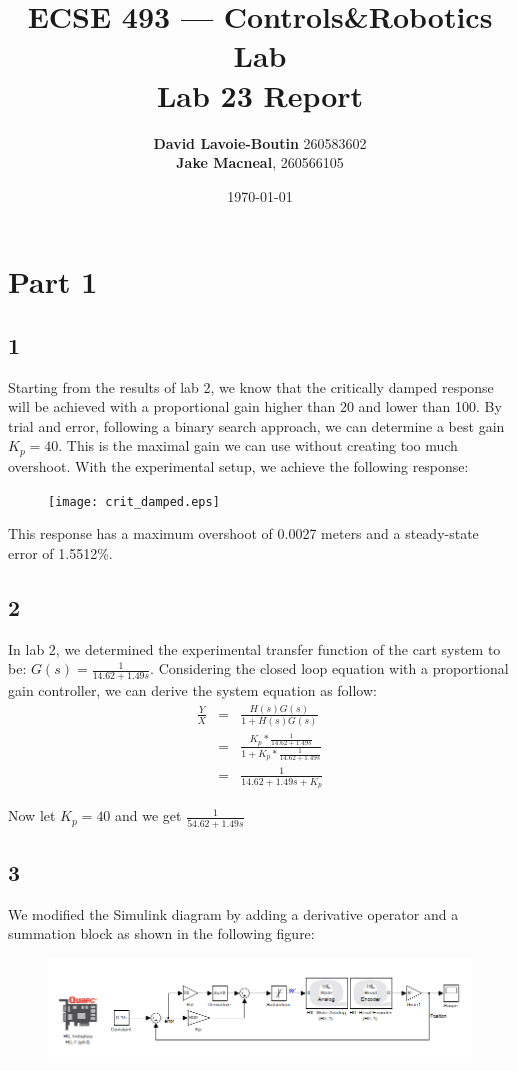 \documentclass{article}
\title{ECSE 493 --- Controls\&Robotics Lab\\Lab 23 Report}
\author{\textbf{David Lavoie-Boutin} 260583602\\ \textbf{Jake Macneal}, 260566105}
\date{\today}
\begin{document}
\maketitle
\section*{Part 1}
\subsection*{1}
Starting from the results of lab 2, we know that the critically damped response will be achieved with a proportional gain higher than 20 and lower than 100. By trial and error, following a binary search approach, we can determine a best gain $K_p = 40$. This is the maximal gain we can use without creating too much overshoot. With the experimental setup, we achieve the following response:

\begin{figure}[!htb]
\centering
\texttt{[image: crit\_damped.eps]}
\end{figure}

This response has a maximum overshoot of 0.0027 meters and a steady-state error of 1.5512\%.
\clearpage
\subsection*{2}
In lab 2, we determined the experimental transfer function of the cart system to be: $G(s) = \frac{1}{14.62+1.49s}$. Considering the closed loop equation with a proportional gain controller, we can derive the system equation as follow:
\begin{eqnarray*}
    \frac{Y}{X} &=& \frac{H(s)G(s)}{1+H(s)G(s)}\\
    &=&\frac{K_p*\frac{1}{14.62+1.49s}}{1+K_p*\frac{1}{14.62+1.49s}}\\
    &=& \frac{1}{14.62+1.49s + K_p}
\end{eqnarray*}

Now let $K_p = 40$ and we get $\frac{1}{54.62+1.49s}$
\subsection*{3}
We modified the Simulink diagram by adding a derivative operator and a summation block as shown in the following figure:
\begin{figure}[!htb]
\centering
\includegraphics[width=\textwidth]{lab3_pd.PNG}
\end{figure}
\end{document}
